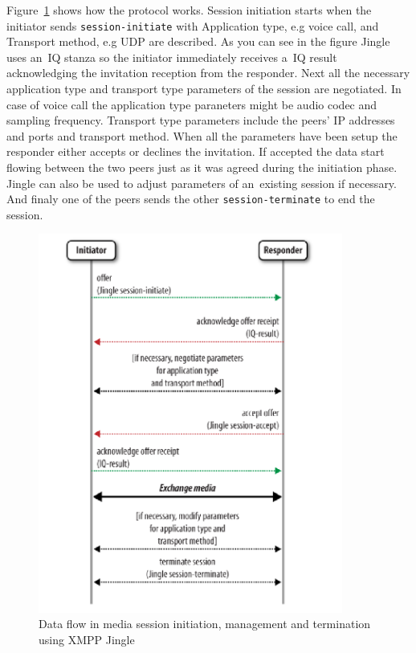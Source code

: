 Figure~\ref{fig:xmppJingleDataFlow} shows how the protocol works. Session initiation starts when the initiator sends \verb|session-initiate| with Application type, e.g voice call, and Transport method, e.g UDP are described. As you can see in the figure Jingle uses an~IQ stanza so the initiator immediately receives a~IQ result acknowledging the invitation reception from the responder. Next all the necessary application type and transport type parameters of the session are negotiated. In case of voice call the application type paraneters might be audio codec and sampling frequency. Transport type parameters include the peers' IP addresses and ports and transport method. When all the parameters have been setup the responder either accepts or declines the invitation. If accepted the data start flowing between the two peers just as it was agreed during the initiation phase. Jingle can also be used to adjust parameters of an~existing session if necessary. And finaly one of the peers sends the other \verb|session-terminate| to end the session. 

\begin{figure}[ht]
\begin{center}
	\includegraphics[width=10cm]{fig/xmpp-jingle-flow.png}
	\caption{Data flow in media session initiation, management and termination using XMPP Jingle \cite{xmppBook}}
	\label{fig:xmppJingleDataFlow}
\end{center}
\end{figure}


